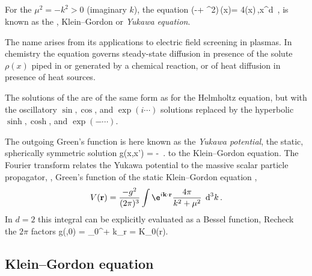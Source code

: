 \subsection{\SPe}
\label{sect:SPe}

For
the ${\mu}^2=-k^2>0$ (imaginary $k$), the equation
\beq
   (-\Box + {\mu}^2)\,\field(x)= 4\pi\rho(x)\,,\qquad x\in \reals^d
\,,
\label{sPe}
\eeq
is known as  the {\em
{\sPe}}, Klein–Gordon or \emph{Yukawa equation}.

The name arises from its applications to electric field screening in
plasmas. In chemistry the equation governs steady-state diffusion in
presence of the solute $\rho(x)$ piped in or
generated by a chemical reaction, or of heat diffusion in presence of
heat sources.

The solutions of the {\sPe}  are of the same form as for the
Helmholtz equation, but with the oscillatory $\sin,\cos$, and $\exp(i
\cdots)$ solutions replaced by the hyperbolic $\sinh,\cosh$, and
$\exp(-\cdots)$.

The outgoing Green's
function  is here known as the \emph{Yukawa
potential},  the static, spherically symmetric solution
\beq
g({x},x') = -
\,.
\label{GreenFunYukawa}
\eeq
 to the Klein–Gordon equation.
The Fourier transform relates the Yukawa potential to the
massive scalar particle
propagator, \ie, Green's function of the static Klein–Gordon equation
,
\[
V(\mathbf{r})
=\frac{-g^2}{(2\pi)^3} \int \e^{i\mathbf{k \cdot r}}
\frac {4\pi}{k^2+{\mu}^2} \;\operatorname{d}^3\!k
\,.
\]
In $d=2$ this integral can be explicitly evaluated as a
Bessel function,
     {Recheck the $2\pi$ factors}
\beq
g(,0)
=  \; \int_{0}^{+\infty} k_r \;
    =  K_0(r{\mu}).
\eeq


\subsection{Klein–Gordon equation}
\label{sect:KleinGord}

